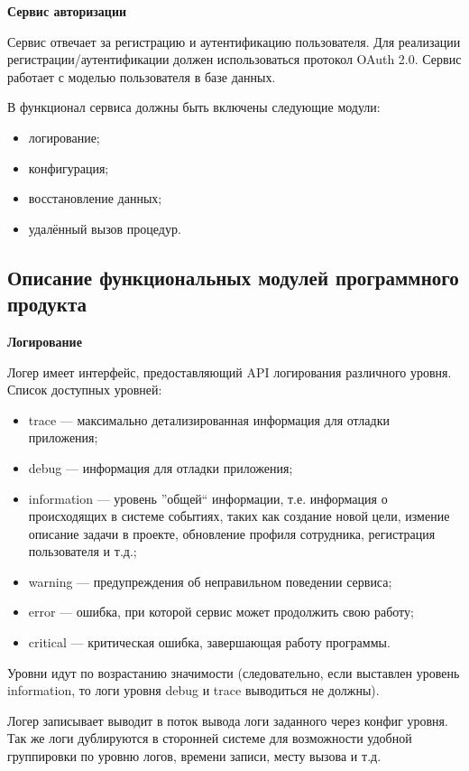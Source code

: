 \bigskip
\textbf{Сервис авторизации}

Сервис отвечает за регистрацию и аутентификацию пользователя. Для реализации регистрации/аутентификации должен использоваться протокол OAuth 2.0. Сервис работает с моделью пользователя в базе данных.

В функционал сервиса должны быть включены следующие модули:
\begin{itemize}
    \item логирование;
    \item конфигурация;
    \item восстановление данных;
    \item удалённый вызов процедур.
\end{itemize}

\subsection{Описание функциональных модулей программного продукта}\label{sec:domain:func}

\textbf{Логирование}

Логер имеет интерфейс, предоставляющий API логирования различного уровня. Список доступных уровней:

\begin{itemize}
    \item trace — максимально детализированная информация для отладки приложения;
    \item debug — информация для отладки приложения;
    \item information  — уровень ''общей`` информации, т.е. информация о происходящих в системе событиях, таких как создание новой цели, измение описание задачи в проекте, обновление профиля сотрудника, регистрация пользователя и т.д.;
    \item warning  — предупреждения об неправильном поведении сервиса;
    \item error — ошибка, при которой сервис может продолжить свою работу;
    \item critical  — критическая ошибка, завершающая работу программы.
\end{itemize}

Уровни идут по возрастанию значимости (следовательно, если выставлен уровень information, то логи уровня debug и trace выводиться не должны).

Логер записывает выводит в поток вывода логи заданного через конфиг уровня. Так же логи дублируются в сторонней системе для возможности удобной группировки по уровню логов, времени записи, месту вызова и т.д.

